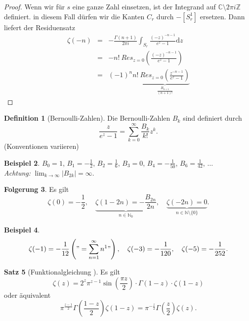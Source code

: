 \documentclass[11pt,titlepage]{article}
\theoremstyle{definition}
\newtheorem{theorem}{Satz}[section]
\newtheorem{corollary}[theorem]{Folgerung}
\newtheorem{definition}[theorem]{Definition}
\newtheorem{example}[theorem]{Beispiel}
\theoremstyle{remark}
\begin{document}
\begin{proof}
		
			
		Wenn wir für $s$ eine ganze Zahl einsetzen, ist der Integrand auf  $\mathbb{C}\setminus 2\pi i\mathbb{Z}$ 
		definiert. 
		in diesem Fall dürfen wir die Kanten $C_r$ durch $-[S_r^1]$ ersetzen. Dann liefert der Residuensatz
		\begin{eqnarray*}
			\zeta(-n)&=& -\frac{\Gamma(n+1)}{2\pi i} \int_{S_r} \frac{(-z)^{-n-1}}{e^z -1}\mathrm{d}z \\
			&=& -n!\ Res_{z=0} \left(\frac{(-z)^{-n-1}}{e^z -1}\right) \\
			&=& (-1)^n n! \ \underbrace{Res_{z=0}\left( \frac{z^{-n-1}}{e^z -1}\right)}_{\frac{B_{n+1}}{(n+1)!}}
		\end{eqnarray*}
	
	\end{proof}

	\begin{definition}[Bernoulli-Zahlen]
		Die Bernoulli-Zahlen $B_k$ sind definiert durch
		\[ \frac{z}{e^z -1}=\sum_{k=0}^{\infty}\frac{B_k}{k!}z^k .\]
		(Konventionen variieren)
	\end{definition}
	
	\begin{example}
		$B_0=1$, $B_1=-\frac{1}{2}$, $B_2=\frac{1}{6}$, $B_3=0$, $B_4=-\frac{1}{50}$, $B_6=\frac{1}{42}$, $\ldots$ \\
		\textsl{Achtung:} $\lim_{k\to\infty} |B_{2k}|=\infty$.
	\end{example}
	
	\begin{corollary}
		Es gilt
		\[ \zeta(0)=-\frac{1}{2},\quad \underbrace{\zeta(1-2n)=-\frac{B_{2n}}{2n}}_{n\in\mathbb{N}_0},\quad 
		\underbrace{\zeta(-2n)=0}_{n\in\mathbb{N}\setminus\{0\}}. \]
	\end{corollary}
	
	\begin{example}
		\[ \zeta(-1)=-\frac{1}{12} \left( "=\sum_{n=1}^{\infty}n^1 "\right),\quad \zeta(-3)=-\frac{1}{120},\quad \zeta(-5)=
		-\frac{1}{252}. \]
	\end{example}
			
    	\begin{theorem}[Funktionalgleichung	]
		Es gilt
		\[ \zeta(z)=2^z \pi^{z-1} \sin\left(\frac{\pi z}{2}\right) \cdot \Gamma(1-z)\cdot \zeta(1-z) \]
		oder äquivalent
		\[ \pi^{\frac{z-1}{2}}\Gamma\left(\frac{1-z}{2}\right) \zeta(1-z) =\pi^{-\frac{z}{2}}\Gamma\left(\frac{z}{2}\right)
		\zeta(z). \]
	\end{theorem}
	
\end{document}
